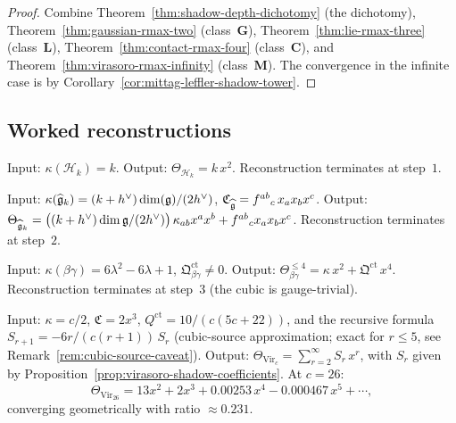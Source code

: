 \begin{proof}
Combine
Theorem~\ref{thm:shadow-depth-dichotomy} (the
dichotomy),
Theorem~\ref{thm:gaussian-rmax-two} (class~\textbf{G}),
Theorem~\ref{thm:lie-rmax-three} (class~\textbf{L}),
Theorem~\ref{thm:contact-rmax-four} (class~\textbf{C}),
and
Theorem~\ref{thm:virasoro-rmax-infinity} (class~\textbf{M}).
The convergence in the infinite case is by
Corollary~\ref{cor:mittag-leffler-shadow-tower}.
\end{proof}


\subsection{Worked reconstructions}
\label{subsec:worked-reconstructions}

\begin{example}
\label{ex:heisenberg-reconstruction}
Input: $\kappa(\mathcal{H}_k) = k$.
Output: $\Theta_{\mathcal{H}_k} = k\,x^2$.
Reconstruction terminates at step~$1$.
\end{example}

\begin{example}
\label{ex:km-reconstruction}
Input: $\kappa(\widehat{\mathfrak{g}}_k) = (k+h^\vee)\dim(\mathfrak{g})/(2h^\vee)$,
$\mathfrak{C}_{\widehat{\mathfrak{g}}} = f^{ab}{}_c\,x_a x_b x^c$.
Output:
$\Theta_{\widehat{\mathfrak{g}}_k} = \bigl((k+h^\vee)\dim\mathfrak{g}/(2h^\vee)\bigr)\,\kappa_{ab}x^a x^b
+ f^{ab}{}_c x_a x_b x^c$.
Reconstruction terminates at step~$2$.
\end{example}

\begin{example}
\label{ex:betagamma-reconstruction}
Input: $\kappa(\beta\gamma) = 6\lambda^2 - 6\lambda + 1$,
$\mathfrak{Q}^{\mathrm{ct}}_{\beta\gamma} \neq 0$.
Output:
$\Theta_{\beta\gamma}^{\leq 4} = \kappa\,x^2 +
\mathfrak{Q}^{\mathrm{ct}}\,x^4$.
Reconstruction terminates at step~$3$ (the cubic is
gauge-trivial).
\end{example}

\begin{example}
\label{ex:virasoro-reconstruction}
Input: $\kappa = c/2$, $\mathfrak{C} = 2x^3$,
$Q^{\mathrm{ct}} = 10/(c(5c+22))$, and the recursive
formula $S_{r+1} = -6r/(c(r+1))\,S_r$
\textup{(}cubic-source approximation; exact for
$r \leq 5$, see
Remark~\textup{\ref{rem:cubic-source-caveat}}\textup{)}.
Output:
$\Theta_{\mathrm{Vir}_c} = \sum_{r=2}^\infty S_r\,x^r$,
with $S_r$ given by
Proposition~\ref{prop:virasoro-shadow-coefficients}.
At $c = 26$:
\[
\Theta_{\mathrm{Vir}_{26}} = 13x^2 + 2x^3
+ 0.00253\,x^4 - 0.000467\,x^5 + \cdots,
\]
converging geometrically with ratio $\approx 0.231$.
\end{example}


